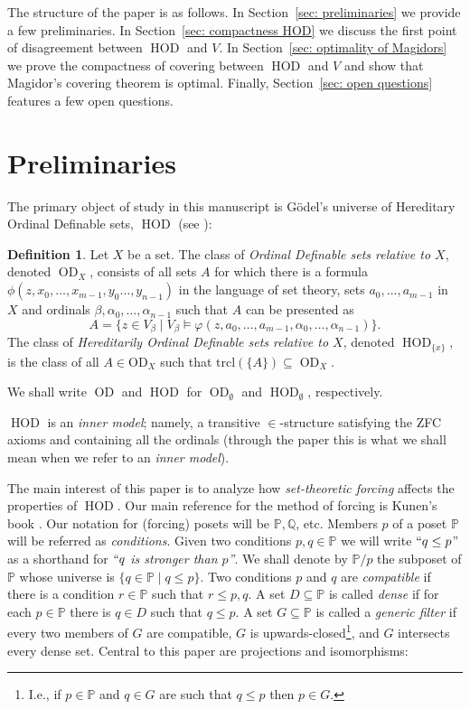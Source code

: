 \documentclass[11pt]{amsart}
\theoremstyle{definition}
\newtheorem{definition}[theorem]{Definition}
\theoremstyle{remark}
\DeclareMathOperator{\HOD}{HOD}
\DeclareMathOperator{\OD}{OD}
\def\s{\subseteq}
\begin{document}
The structure of the paper is as follows. In Section~\ref{sec: preliminaries} we provide a few preliminaries. In Section~\ref{sec: compactness HOD} we discuss the first point of disagreement between $\HOD$ and $V$. In Section~\ref{sec: optimality of Magidors} we prove the compactness of covering between $\HOD$ and $V$ and show that Magidor's covering theorem is optimal. Finally, Section~\ref{sec: open questions} features a few open questions.



\section{Preliminaries}\label{sec: coding}\label{sec: preliminaries}

The primary object of study in this manuscript is Gödel's universe of Hereditary Ordinal Definable sets, $\HOD$ (see \cite{Godel, Myhill}):
\begin{definition}
    Let $X$  be a set. The class of  \emph{Ordinal Definable sets relative to $X$}, denoted $\OD_X$,  consists of all sets $A$ for which there is a formula $\phi(z, x_0,\dots, x_{m-1},y_0\dots, y_{n-1})$ in the language of set theory, sets $a_0,\dots, a_{m-1}$ in  $X$ and ordinals $\beta, \alpha_0,\dots, \alpha_{n-1}$ such that $A$ can be presented as $$A=\{z\in V_\beta \mid V_\beta \models \varphi(z,a_0,\dots,a_{m-1},\alpha_0,\dots, \alpha_{n-1})\}.$$
    The class of \emph{Hereditarily Ordinal Definable sets relative to $X$}, denoted $\HOD_{\{x\}}$, is the class of all $A\in \mathrm{OD}_X$ such that $\mathrm{trcl}(\{A\})\s \OD_X$.

   We shall write $\OD$ and $\HOD$ for $\OD_\emptyset$ and $\HOD_\emptyset$, respectively.
\end{definition}
$\HOD$ is an \emph{inner model}; namely, a transitive $\in$-structure satisfying the ZFC axioms and containing all the ordinals (through the paper this is what we shall mean when we refer to an \emph{inner model}).

\smallskip

The main interest of this paper is to analyze how \emph{set-theoretic forcing} affects the properties of $\HOD$. Our main reference for the method of forcing is Kunen's book \cite{Kunen}. 
 Our notation for (forcing) posets will be $\mathbb{P},  \mathbb{Q}$, etc. Members $p$ of a poset $\mathbb{P}$ will be referred as \emph{conditions}. Given two conditions $p,q\in \mathbb{P}$ we will write $``q\leq p$'' as a shorthand for \emph{$``q$ is stronger than $p$''}. We shall denote by $\mathbb{P}/p$ the subposet of $\mathbb{P}$ whose universe is  $\{q\in \mathbb{P}\mid q\leq p\}$. Two conditions $p$ and $q$ are \emph{compatible} if there is a condition $r\in \mathbb{P}$ such that $r\leq p,q$. A set $D\s \mathbb{P}$ is called \emph{dense} if for each $p\in \mathbb{P}$ there is $q\in D$ such that $q\leq p$. A set $G\s \mathbb{P}$ is called a \emph{generic filter} if every two members of $G$ are compatible, $G$ is upwards-closed\footnote{I.e., if $p\in \mathbb{P}$ and $q\in G$ are such that $q\leq p$ then $p\in G$.}, and $G$ intersects every dense set. Central to this paper are projections and isomorphisms:
\end{document}

